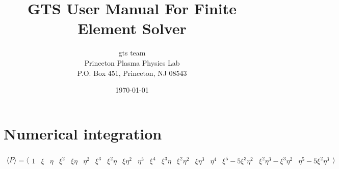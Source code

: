 \documentclass{report}
\title{GTS User Manual For Finite Element Solver}
\author{gts team\\
        Princeton Plasma Physics Lab\\
        P.O. Box 451, Princeton, NJ 08543\\
       }
\date{\today}
\begin{document}
\maketitle
\tableofcontents

\section{Numerical integration}
\begin{equation}
\begin{array}{l}
\bigl \langle
P
\bigr \rangle
=
\bigl \langle
\begin{array}{lllllllllllllllllll}
1 
&\xi   &\eta 
&\xi^2 &\xi\eta     &\eta^2 
&\xi^3 &\xi^2\eta   &\xi\eta^2               &\eta^3 
&\xi^4 &\xi^3\eta   &\xi^2\eta^2             &\xi\eta^3              &\eta^4 
&\xi^5-5\xi^3\eta^2 &\xi^2\eta^3-\xi^3\eta^2 &\eta^5-5\xi^2\eta^3
\end{array}
\bigr \rangle
\end{array}
\end{equation}
\end{document}
